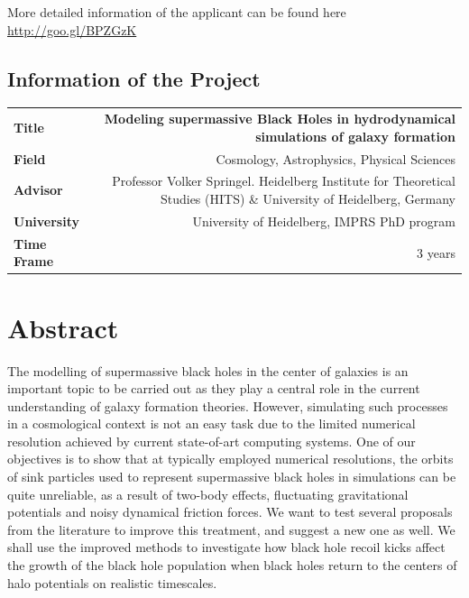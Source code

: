 \documentclass[a4,useAMS,usenatbib,usegraphicx,12pt]{article}
\begin{document}
\vspace{10pt}

More detailed information of the applicant can be found here \url{http://goo.gl/BPZGzK}

\vspace{15pt}  

\subsection*{Information of the Project}
\begin{tabular}{L!{\VRule}R}
\bf Title		& \bf Modeling supermassive Black Holes in hydrodynamical simulations of
				galaxy formation\\
\bf Field		& Cosmology, Astrophysics, Physical Sciences \\
\bf Advisor	& Professor Volker Springel. Heidelberg Institute for Theoretical Studies (HITS) 
\& University of Heidelberg, Germany \\
\bf University	& University of Heidelberg, IMPRS PhD program \\
\bf Time Frame	& 3 years \\
\end{tabular}
\normalsize


\section{Abstract}


The modelling of supermassive black holes in the center of galaxies is an important 
topic to be carried out as they play a central role in the current understanding
of galaxy formation theories. However, simulating such processes in a cosmological 
context is not an easy task due to the limited numerical resolution achieved by 
current state-of-art computing systems. One of our objectives is to show that at 
typically employed numerical resolutions, the orbits of sink particles used to 
represent supermassive black holes in simulations can be quite unreliable, as a 
result of two-body effects, fluctuating gravitational potentials and noisy 
dynamical friction forces. We want to test several proposals from the literature 
to improve this treatment, and suggest a new one as well. We shall use the 
improved methods to investigate how black hole recoil kicks affect the growth of 
the black hole population when black holes return to the centers of halo potentials 
on realistic timescales.
\end{document}

